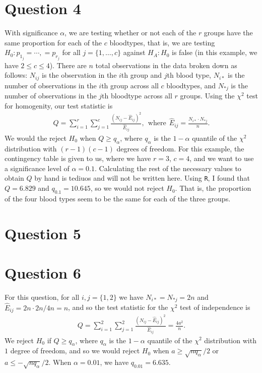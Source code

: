 \documentclass[10pt]{article}
\begin{document}
\section{Question 4} \noindent
With significance \(\alpha\), we are testing whether or not each of the \(r\) groups have the same proportion for each of the \(c\) bloodtypes, that is, we 
are testing \(H_0: p_{1_j} = \cdots, = p_{r_j}\) for all \(j = \{1, \ldots, c\}\) against \(H_A : H_0\) is false (in this example, we have \(2 \le c \le 4\)). 
There are \(n\) total observations in the data broken down as follows: \(N_{ij}\) is the observation in the \(i\)th group and \(j\)th blood type, 
\(N_{i*}\) is the number of observations in the \(i\)th group across all \(c\) bloodtypes, and \(N_{*j}\) is the number of observations in the 
\(j\)th bloodtype across all \(r\) groups. 
Using the \(\chi^2\) test for homogenity, our test statistic is 
\begin{align*}
    Q
    = \sum_{i=1}^r \sum_{j=1}^c \frac{(N_{ij} - \hat{E}_{ij})^2}{\hat{E}_{ij}},
    ~~\text{where}~~
    \hat{E}_{ij} = \frac{N_{i*} \cdot N_{*j}}{n}.
\end{align*}
We would the reject \(H_0\) when \(Q \ge q_{\alpha}\), where \(q_{\alpha}\) is the \(1 - \alpha\) quantile of the \(\chi^2\) distribution with 
\((r - 1)(c - 1)\) degrees of freedom. For this example, the contingency table is given to us, where we have \(r = 3\), \(c = 4\), and we want 
to use a significance level of \(\alpha = 0.1\).
Calculating the rest of the necessary values to obtain \(Q\) by hand is tediuos and will not be written here. 
Using \texttt{R}, I found that \(Q = 6.829\) and \(q_{0.1} = 10.645\), so we would not reject \(H_0\). That is, the proportion of the four blood types 
seem to be the same for each of the three groups. 

\section{Question 5} \noindent


\section{Question 6} \noindent
For this question, for all \(i,j = \{1,2\}\) we have \(N_{i*} = N_{*j} = 2n\) and \(\hat{E}_{ij} = 2n \cdot 2n / 4n = n\), and so the test statistic for the 
\(\chi^2\) test of independence is 
\begin{align*}
    Q
    = \sum_{i=1}^2 \sum_{j=1}^2 \frac{(N_{ij} - \hat{E}_{ij})^2}{\hat{E}_{ij}}
    = \frac{4 a^2}{n}.
\end{align*}
We reject \(H_0\) if \(Q \ge q_{\alpha}\), where \(q_{\alpha}\) is the \(1 - \alpha\) quantile of the \(\chi^2\) distribution with 
\(1\) degree of freedom, and so we would reject \(H_0\) when \(a \ge \sqrt{n q_{\alpha}} / 2\) or \(a \le - \sqrt{n q_{\alpha}} / 2\).
When \(\alpha = 0.01\), we have \(q_{0.01} = 6.635\).
\end{document}
